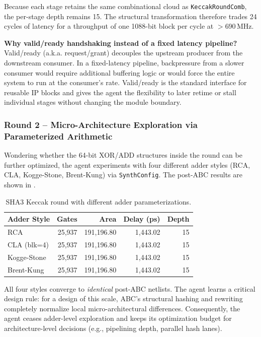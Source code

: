 \documentclass[11pt]{article}
\begin{document}
Because each stage retains the same combinational cloud as \texttt{KeccakRoundComb}, the per-stage depth remains 15. The structural transformation therefore trades 24 cycles of latency for a throughput of one 1088-bit block per cycle at $>$690\,MHz.

\textbf{Why valid/ready handshaking instead of a fixed latency pipeline?} Valid/ready (a.k.a. request/grant) decouples the upstream producer from the downstream consumer. In a fixed-latency pipeline, backpressure from a slower consumer would require additional buffering logic or would force the entire system to run at the consumer's rate. Valid/ready is the standard interface for reusable IP blocks and gives the agent the flexibility to later retime or stall individual stages without changing the module boundary.

\subsubsection{Round 2 -- Micro-Architecture Exploration via Parameterized Arithmetic}

Wondering whether the 64-bit XOR/ADD structures inside the round can be further optimized, the agent experiments with four different adder styles (RCA, CLA, Kogge-Stone, Brent-Kung) via \texttt{SynthConfig}. The post-ABC results are shown in .

\begin{table}[htbp]
\centering
\caption{SHA3 Keccak round with different adder parameterizations.}
\label{tab:sha3_adder}
\begin{tabular}{@{}lrrrr@{}}
\toprule
\textbf{Adder Style} & \textbf{Gates} & \textbf{Area} & \textbf{Delay (ps)} & \textbf{Depth} \\
\midrule
RCA         & 25,937 & 191,196.80 & 1,443.02 & 15 \\
CLA (blk=4) & 25,937 & 191,196.80 & 1,443.02 & 15 \\
Kogge-Stone & 25,937 & 191,196.80 & 1,443.02 & 15 \\
Brent-Kung  & 25,937 & 191,196.80 & 1,443.02 & 15 \\
\bottomrule
\end{tabular}
\end{table}

All four styles converge to \textit{identical} post-ABC netlists. The agent learns a critical design rule: for a design of this scale, ABC's structural hashing and rewriting completely normalize local micro-architectural differences. Consequently, the agent ceases adder-level exploration and keeps its optimization budget for architecture-level decisions (e.g., pipelining depth, parallel hash lanes).
\end{document}
